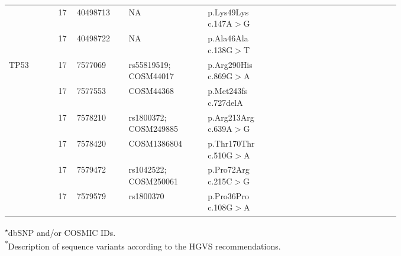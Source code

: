 \begin{longtable}{p{0.1\linewidth}|p{0.02\linewidth}p{0.1\linewidth}p{0.16\linewidth}p{0.15\linewidth}p{0.08\linewidth}p{0.08\linewidth}p{0.08\linewidth}}
		\\
		& 17 & 40498713 & NA & p.Lys49Lys c.147A$>$G & & &
		\\
		& 17 & 40498722 & NA & p.Ala46Ala c.138G$>$T & & &
		\\
		\hline
		TP53 & 17 & 7577069 & rs55819519; COSM44017 & p.Arg290His c.869G$>$A & & &
		\\
		& 17 & 7577553 & COSM44368 & p.Met243fs c.727delA & & &
		\\
		& 17 & 7578210 & rs1800372; COSM249885 & p.Arg213Arg c.639A$>$G & & &
		\\
		& 17 & 7578420 & COSM1386804 & p.Thr170Thr c.510G$>$A & & &
		\\
		& 17 & 7579472 & rs1042522; COSM250061 & p.Pro72Arg c.215C$>$G & & &
		\\
		& 17 & 7579579 & rs1800370 & p.Pro36Pro c.108G$>$A & & &
		\\
		\hline
\end{longtable}

\noindent\textsuperscript{$\star$}dbSNP and/or COSMIC IDs.
\\
\textsuperscript{*}Description of sequence variants according to the HGVS recommendations.


